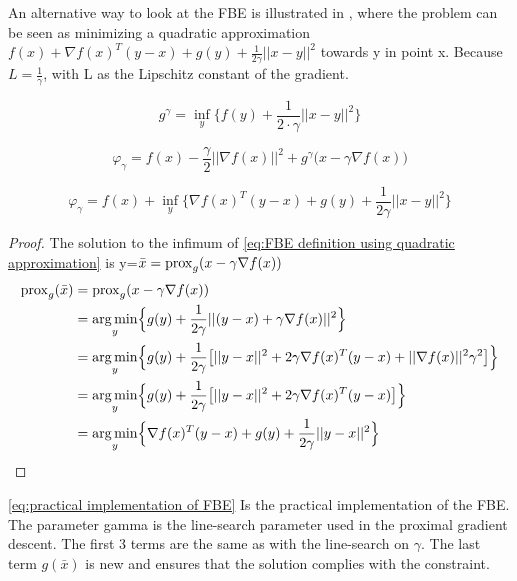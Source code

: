 		An alternative way to look at the FBE is illustrated in \cite{AjaySathya2017}, where the problem can be seen as minimizing a quadratic approximation  $f(x) +  \nabla f(x)^T(y-x) + g(y) + \frac{1}{2 \gamma} ||x-y||^2  $ towards y in point x.  Because $L = \frac{1}{\gamma}$, with L as the Lipschitz constant of the gradient.
		
		\begin{equation}
			g^{\gamma} = \underset{y}{\inf} \big \{f(y)+\frac{1}{2 \cdot \gamma}||x-y||^2 \big \}
			\label{eq:Moreau envelope}
		\end{equation}
		
		\begin{equation}
		\varphi_{\gamma} = f(x) - \frac{\gamma}{2}||\nabla f(x)||^2 + g^{\gamma} \big(x-\gamma \nabla f(x) \big)
		\label{eq:FBE definition using Moreau envelope}
		\end{equation}
		
		\begin{equation}
		\varphi_{\gamma} =   f(x) + \underset{y}{\inf} \Big\{ \nabla f(x)^T(y-x) + g(y) + \frac{1}{2 \gamma} ||x-y||^2  \Big\}
		\label{eq:FBE definition using quadratic approximation}
		\end{equation}
		
		\begin{proof}
			The solution to the infimum of \eqref{eq:FBE definition using quadratic approximation} is y=$\bar{x}=\operatorname{prox}_g(x-\gamma \nabla f(x))$
			\begin{align*}
			\operatorname{prox}_g(\bar{x}) 
			&=\operatorname{prox}_g(x- \gamma \nabla f(x)) \\
			&= \underset{y}{\operatorname*{arg\,min}} \Big \{ g(y) 
			+ \frac{1}{2 \gamma}||(y-x) + \gamma \nabla f(x)||^2 \Big \} \\
			&= \underset{y}{\operatorname*{arg\,min}} \Big \{ g(y) 
			+ \frac{1}{2 \gamma} \big[||y-x||^2 + 2 \gamma \nabla f(x)^T(y-x) + ||\nabla f(x)||^2\gamma^2 \big] \Big \} \\
			&= \underset{y}{\operatorname*{arg\,min}} \Big \{ g(y) 
			+ \frac{1}{2 \gamma} \big[||y-x||^2 + 2 \gamma \nabla f(x)^T(y-x)  \big] \Big \}\\
			&= \underset{y}{\operatorname*{arg\,min}} \Big \{   \nabla f(x)^T(y-x)  + g(y) 
			+ \frac{1}{2 \gamma} ||y-x||^2  \Big  \}
			\end{align*}
			\label{prf:prox is solution to FBE inf}
		\end{proof}
		
		\eqref{eq:practical implementation of FBE} Is the practical implementation of the FBE. The parameter gamma is the line-search parameter used in the proximal gradient descent. The first 3 terms are the same as with the line-search on $\gamma$. The last term $g(\bar{x})$ is new and ensures that the solution complies with the constraint.
		
